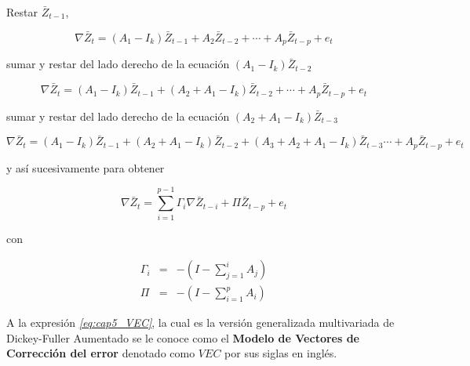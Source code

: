  Restar $\bar{Z}_{t-1}$,

 \begin{equation}
 \nabla \bar{Z}_t= (A_1- I_k)\bar{Z}_{t-1} + A_2\bar{Z}_{t-2}+ \cdots + A_p\bar{Z}_{t-p} +e_t \nonumber
 \end{equation}

sumar y restar del lado derecho de la ecuación $(A_1-I_k)\bar{Z}_{t-2}$

 \begin{equation}
\nabla \bar{Z}_t= (A_1- I_k)\bar{Z}_{t-1} + (A_2+ A_1-I_k)\bar{Z}_{t-2}+ \cdots + A_p\bar{Z}_{t-p}+e_t \nonumber
 \end{equation}
 
 sumar y restar del lado derecho de la ecuación $(A_2+A_1-I_k)\bar{Z}_{t-3}$
 
  \begin{equation}
\nabla \bar{Z}_t= (A_1- I_k)\bar{Z}_{t-1} + (A_2+ A_1-I_k)\bar{Z}_{t-2}+  (A_3+A_2+ A_1-I_k)\bar{Z}_{t-3}\cdots + A_p\bar{Z}_{t-p}+e_t \nonumber
 \end{equation}
 
 y así sucesivamente para obtener 
 
   \begin{equation}  \label{eq:cap5_VEC} %
\nabla \bar{Z}_t=\sum_{i=1}^{p-1}\Gamma_i\nabla\bar{Z}_{t-i} + \Pi\bar{Z}_{t-p}+  e_t
 \end{equation}
 
con 

\begin{eqnarray}
\Gamma_i&=&-\left (I-\sum_{j=1}^{i} A_j  \right )\\
\Pi&=&-\left (I-\sum_{i=1}^{p} A_i  \right )
\end{eqnarray}

A la expresión \textit{\ref{eq:cap5_VEC}}, la cual es la versión generalizada multivariada de Dickey-Fuller Aumentado se le conoce como el \textbf{Modelo de Vectores de Corrección del error} denotado como $VEC$ por sus siglas en inglés. \bigskip 

